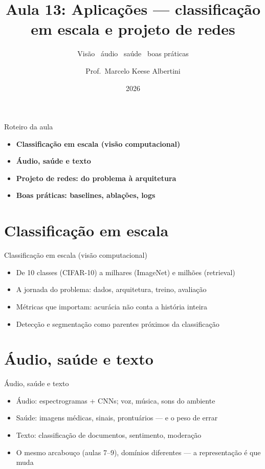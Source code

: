 \documentclass[aspectratio=169, 11pt]{beamer}
\title[Aula 13 — Classificação em escala]{Aula 13: Aplicações — classificação em escala e projeto de redes}
\subtitle[GBC073 — Inteligência Computacional]{Visão \textbullet\ áudio \textbullet\ saúde \textbullet\ boas práticas}
\author[Prof.\ Marcelo Albertini]{Prof.\ Marcelo Keese Albertini}
\institute{GBC073 — Inteligência Computacional \textbullet\ Universidade Federal de Uberlândia}
\date{2026}
\begin{document}
\begin{frame}
  \titlepage
\end{frame}

\begin{frame}{Roteiro da aula}
  \begin{itemize}\setlength{\itemsep}{0.5ex}
    \item<1-> \textbf{Classificação em escala (visão computacional)}
    \item<2-> \textbf{Áudio, saúde e texto}
    \item<3-> \textbf{Projeto de redes: do problema à arquitetura}
    \item<4-> \textbf{Boas práticas: baselines, ablações, logs}
  \end{itemize}
\end{frame}

\section{Classificação em escala}

\begin{frame}{Classificação em escala (visão computacional)}
  \begin{itemize}\setlength{\itemsep}{0.4ex}
    \item De 10 classes (CIFAR-10) a milhares (ImageNet) e milhões (retrieval)
    \item A jornada do problema: dados, arquitetura, treino, avaliação
    \item Métricas que importam: acurácia não conta a história inteira
    \item Detecção e segmentação como parentes próximos da classificação
  \end{itemize}
\end{frame}

\section{Áudio, saúde e texto}

\begin{frame}{Áudio, saúde e texto}
  \begin{itemize}\setlength{\itemsep}{0.4ex}
    \item Áudio: espectrogramas + CNNs; voz, música, sons do ambiente
    \item Saúde: imagens médicas, sinais, prontuários — e o peso de errar
    \item Texto: classificação de documentos, sentimento, moderação
    \item O mesmo arcabouço (aulas 7--9), domínios diferentes — a
          representação é que muda
  \end{itemize}
\end{frame}
\end{document}
